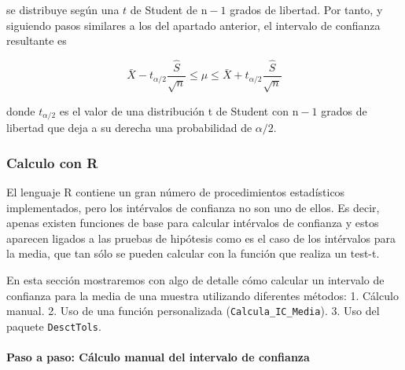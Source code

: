 \documentclass[
]{article}
\begin{document}
se distribuye según una \(t\) de Student de \(\mathrm{n}-1\) grados de libertad. Por tanto, y siguiendo pasos similares a los del apartado anterior, el intervalo de confianza resultante es

\[
\bar{X}-t_{\alpha / 2} \frac{\hat{S}}{\sqrt{n}} \leq \mu \leq \bar{X}+t_{\alpha / 2} \frac{\hat{S}}{\sqrt{n}}
\]

donde \(t_{\alpha / 2}\) es el valor de una distribución t de Student con \(\mathrm{n}-1\) grados de libertad que deja a su derecha una probabilidad de \(\alpha / 2\).

\subsubsection{Calculo con R}\label{calculo-con-r}

El lenguaje R contiene un gran número de procedimientos estadísticos implementados, pero los intérvalos de confianza no son uno de ellos. Es decir, apenas existen funciones de base para calcular intérvalos de confianza y estos aparecen ligados a las pruebas de hipótesis como es el caso de los intérvalos para la media, que tan sólo se pueden calcular con la función que realiza un test-t.

En esta sección mostraremos con algo de detalle cómo calcular un intervalo de confianza para la media de una muestra utilizando diferentes métodos:
1. Cálculo manual.
2. Uso de una función personalizada (\texttt{Calcula\_IC\_Media}).
3. Uso del paquete \texttt{DesctTols}.

\paragraph{Paso a paso: Cálculo manual del intervalo de confianza}\label{paso-a-paso-cuxe1lculo-manual-del-intervalo-de-confianza}
\end{document}
